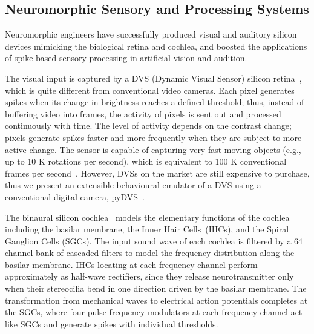\subsection{Neuromorphic Sensory and Processing Systems}
\label{sec:morph}
Neuromorphic engineers have successfully produced visual and auditory silicon devices mimicking the biological retina and cochlea, and boosted the applications of spike-based sensory processing in artificial vision and audition.

The visual input is captured by a DVS (Dynamic Visual Sensor) silicon retina~\citep{delbruck2008frame,serrano2013128}, which is quite different from conventional video cameras.
Each pixel generates spikes when its change in brightness reaches a defined threshold;
thus, instead of buffering video into frames, the activity of pixels is sent out and processed continuously with time.
The level of activity depends on the contrast change; pixels generate spikes faster and more frequently when they are subject to more active change.
The sensor is capable of capturing very fast moving objects (e.g., up to 10 K rotations per second), which is equivalent to 100 K conventional frames per second~\citep{lenero20113}.
However, DVSs on the market are still expensive to purchase, thus we present an extensible behavioural emulator of a DVS using a conventional digital camera, pyDVS~\citep{7850249}.

The binaural silicon cochlea~\citep{5537164} models the elementary functions of the cochlea including the basilar membrane, the Inner Hair Cells~(IHCs), and the Spiral Ganglion Cells (SGCs).
The input sound wave of each cochlea is filtered by a 64 channel bank of cascaded filters to model the frequency distribution along the basilar membrane.
IHCs locating at each frequency channel perform approximately as half-wave rectifiers, since they release neurotransmitter only when their stereocilia bend in one direction driven by the basilar membrane.
The transformation from mechanical waves to electrical action potentials completes at the SGCs, where four pulse-frequency modulators at each frequency channel act like SGCs and generate spikes with individual thresholds.


